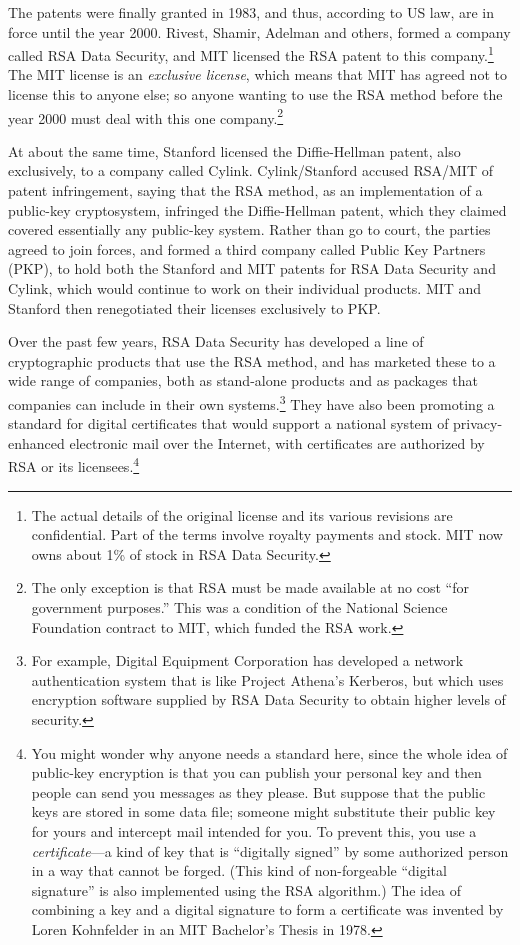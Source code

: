 The patents were finally granted in 1983, and thus, according to US
law, are in force until the year 2000.  Rivest, Shamir, Adelman and
others, formed a company called RSA Data Security, and MIT licensed
the RSA patent to this company.\footnote{The actual details of the
original license and its various revisions are confidential.  Part of
the terms involve royalty payments and stock.  MIT now owns about 1\%
of stock in RSA Data Security.} The MIT license is an {\it exclusive
license}, which means that MIT has agreed not to license this to
anyone else; so anyone wanting to use the RSA method before the year
2000 must deal with this one company.\footnote{The only exception is
that RSA must be made available at no cost ``for government
purposes.''  This was a condition of the National Science Foundation
contract to MIT, which funded the RSA work.}

At about the same time, Stanford licensed the Diffie-Hellman patent,
also exclusively, to a company called Cylink.  Cylink/Stanford accused
RSA/MIT of patent infringement, saying that the RSA method, as an
implementation of a public-key cryptosystem, infringed the
Diffie-Hellman patent, which they claimed covered essentially any
public-key system.  Rather than go to court, the parties agreed to
join forces, and formed a third company called Public Key Partners
(PKP), to hold both the Stanford and MIT patents for RSA Data Security
and Cylink, which would continue to work on their individual products.
MIT and Stanford then renegotiated their licenses exclusively to PKP.

Over the past few years, RSA Data Security has developed a line of
cryptographic products that use the RSA method, and has marketed these
to a wide range of companies, both as stand-alone products and as
packages that companies can include in their own systems.\footnote{For
example, Digital Equipment Corporation has developed a network
authentication system that is like Project Athena's Kerberos, but
which uses encryption software supplied by RSA Data Security to obtain
higher levels of security.} They have also been promoting a standard
for digital certificates that would support a national system of
privacy-enhanced electronic mail over the Internet, with certificates
are authorized by RSA or its licensees.\footnote{You might wonder why
anyone needs a standard here, since the whole idea of public-key
encryption is that you can publish your personal key and then people
can send you messages as they please.  But suppose that the public
keys are stored in some data file; someone might substitute their
public key for yours and intercept mail intended for you.  To prevent
this, you use a {\it certificate}---a kind of key that is ``digitally
signed'' by some authorized person in a way that cannot be forged.
(This kind of non-forgeable ``digital signature'' is also implemented
using the RSA algorithm.)  The idea of combining a key and a digital
signature to form a certificate was invented by Loren Kohnfelder in an
MIT Bachelor's Thesis in 1978.}

